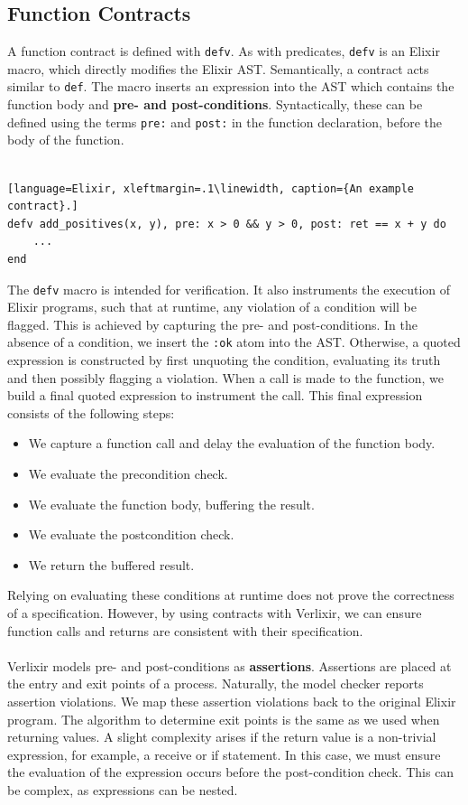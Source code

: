 \subsection{Function Contracts}
A function contract is defined with \texttt{defv}. As with predicates, \texttt{defv} is an Elixir macro, which directly modifies the Elixir AST. Semantically, a contract acts similar to \texttt{def}. The macro inserts an expression into the AST which contains the function body and \textbf{pre- and post-conditions}. Syntactically, these can be defined using the terms \texttt{pre:} and \texttt{post:} in the function declaration, before the body of the function.
\\ \\
\begin{lstlisting}[language=Elixir, xleftmargin=.1\linewidth, caption={An example contract}.]
defv add_positives(x, y), pre: x > 0 && y > 0, post: ret == x + y do
    ...
end
\end{lstlisting}
The \texttt{defv} macro is intended for verification. It also instruments the execution of Elixir programs, such that at runtime, any violation of a condition will be flagged. This is achieved by capturing the pre- and post-conditions. In the absence of a condition, we insert the \texttt{:ok} atom into the AST. Otherwise, a quoted expression is constructed by first unquoting the condition, evaluating its truth and then possibly flagging a violation. When a call is made to the function, we build a final quoted expression to instrument the call. This final expression consists of the following steps:
\begin{itemize}
    \item We capture a function call and delay the evaluation of the function body.
    \item We evaluate the precondition check.
    \item We evaluate the function body, buffering the result.
    \item We evaluate the postcondition check.
    \item We return the buffered result.
\end{itemize}
Relying on evaluating these conditions at runtime does not prove the correctness of a specification. However, by using contracts with Verlixir, we can ensure function calls and returns are consistent with their specification.
\\ \\
Verlixir models pre- and post-conditions as \textbf{assertions}. Assertions are placed at the entry and exit points of a process. Naturally, the model checker reports assertion violations. We map these assertion violations back to the original Elixir program. The algorithm to determine exit points is the same as we used when returning values. A slight complexity arises if the return value is a non-trivial expression, for example, a receive or if statement. In this case, we must ensure the evaluation of the expression occurs before the post-condition check. This can be complex, as expressions can be nested.
\\ \\


